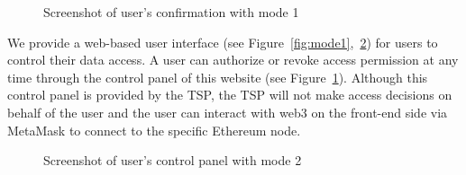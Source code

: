 \begin{figure}[htb]
    \centering
    \caption{{\footnotesize Screenshot of user's confirmation with mode 1}}
    \label{fig:mode1confirm}
\end{figure}

We provide a web-based user interface (see Figure~\ref{fig:mode1},~\ref{fig:mode2}) for users to control their data access. A user can authorize or revoke access permission at any time through the control panel of this website (see Figure~\ref{fig:mode1confirm}). Although this control panel is provided by the TSP, the TSP will not make access decisions on behalf of the user and the user can interact with web3 on the front-end side via MetaMask to connect to the specific Ethereum node.

\begin{figure}[htb]
    \centering
    \caption{{\footnotesize Screenshot of user's control panel with mode 2}}
    \label{fig:mode2}
\end{figure}

